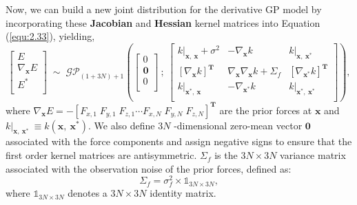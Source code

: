 Now, we can build a new joint distribution for the derivative GP model by incorporating these \textbf{Jacobian} and \textbf{Hessian} kernel matrices into Equation (\ref{equ:2.33}), yielding,
\begin{equation}
    \label{equ:2.41}
         \begin{bmatrix}
         E\\
         \nabla_{\mathbf{x}} E\\
         E^{*}\\
         \end{bmatrix}
        \;\mathtt{\sim}\;
        \mathcal{GP}_{(1+3N)+1}\left(
        \begin{bmatrix}
         0\\
         \mathbf{0}\\
         0\\
         \end{bmatrix}\:
         ;\:\begin{bmatrix}
             k|_{\mathbf{x},\:\mathbf{x}}+\sigma^{2} & -\nabla_{\mathbf{x}} k & k|_{\mathbf{x},\:\mathbf{x}^{*}}\\
             \left[\nabla_{\mathbf{x}} k\right]^{\textbf{T}}  & \nabla_{\mathbf{x}}\nabla_{\mathbf{x}} k +\Sigma_{f}& \left[\nabla_{\mathbf{x}^{*}} k\right]^{\textbf{T}} \\
             k|_{\mathbf{x}^{*},\:\mathbf{x}} & -\nabla_{\mathbf{x}^{*}} k & k|_{\mathbf{x}^{*},\:\mathbf{x}^{*}}\\
         \end{bmatrix}\right),
\end{equation}  
where $\nabla_{\mathbf{x}} E = -\left[F_{x,1}\;F_{y,1}\;F_{z,1}\cdots F_{x,N}\;F_{y,N}\;F_{z,N} \right]^{\mathbf{T}}$ are the prior forces at $\mathbf{x}$ and $k|_{\mathbf{x},\:\mathbf{x}^{*}} ~\equiv k(\mathbf{x},\:\mathbf{x}^{*})$.
We also define $3N$ -dimensional zero-mean vector $\mathbf{0}$ associated with the force components and assign negative signs to ensure that the first order kernel matrices are antisymmetric.
$\Sigma_{f}$ is the $3N \times 3N$ variance matrix associated with the observation noise of the prior forces, defined as:
\begin{equation}
    \label{equ:2.42}
        \Sigma_{f} = \sigma^{2}_{f}\times\mathbb{1}_{3N \times 3N},
\end{equation} 
where $\mathbb{1}_{3N \times 3N}$ denotes a $3N \times 3N$ identity matrix.

